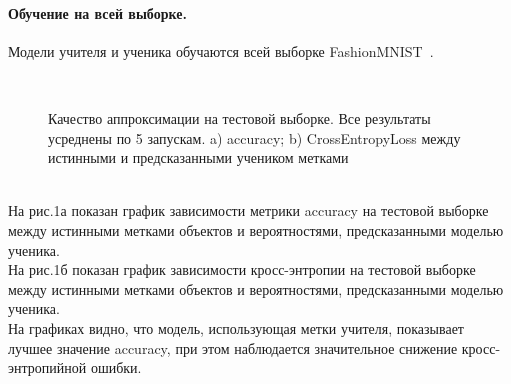 \paragraph{Обучение на всей выборке.}
Модели учителя и ученика обучаются всей выборке FashionMNIST~\cite{FMNIST}.\\
\begin{figure}[h!t]\center
{}
\\
\caption{Качество аппроксимации на тестовой выборке. Все результаты усреднены по 5 запускам. a) accuracy; b) CrossEntropyLoss между истинными и предсказанными учеником метками}
\end{figure}\\
На рис.1а показан график зависимости метрики accuracy на тестовой выборке между истинными метками объектов и вероятностями, предсказанными моделью ученика.\\
На рис.1б показан график зависимости кросс-энтропии на тестовой выборке между истинными метками объектов и вероятностями, предсказанными моделью ученика.\\
На графиках видно, что модель, использующая метки учителя, показывает лучшее значение accuracy, при этом наблюдается значительное снижение кросс-энтропийной ошибки.


